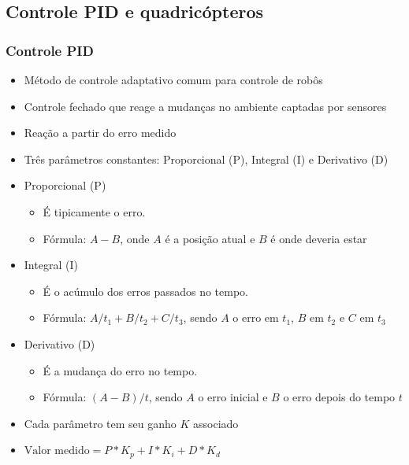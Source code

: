 \documentclass{beamer}
\begin{document}
\subsection*{Controle PID e quadricópteros}
\begin{frame}[allowframebreaks]
	
	\frametitle{Controle PID}
	\begin{itemize}
	
		\item Método de controle adaptativo comum para controle de robôs
		
		\item Controle fechado que reage a mudanças no ambiente captadas por sensores
		
		\item Reação a partir do erro medido
		
		\item Três parâmetros constantes: Proporcional (P), Integral (I) e Derivativo (D)
		
	\framebreak
	
		\item Proporcional (P)
			\begin{itemize}
				\item É tipicamente o erro. 
				\item Fórmula: $A - B$, onde $A$ é a posição atual e $B$ é onde deveria estar 	
			\end{itemize}
			
		\item Integral (I)
		\begin{itemize}
			\item É o acúmulo dos erros passados no tempo. 
			\item Fórmula: $A/t_1 + B/t_2 + C/t_3$, sendo $A$ o erro em $t_1$, $B$ em $t_2$ e $C$ em $t_3$ 	
		\end{itemize}	
		
		\item Derivativo (D)
		\begin{itemize}
			\item É a mudança do erro no tempo. 
			\item Fórmula: $(A-B)/t$, sendo $A$ o erro inicial e $B$ o erro depois do tempo $t$ 	
		\end{itemize}	
		
	\framebreak
	
		\item Cada parâmetro tem seu ganho $K$ associado
		
		\item $ \mbox{Valor medido} = P*K_p + I*K_i + D*K_d$
		

\end{itemize}
\end{frame}
\end{document}
